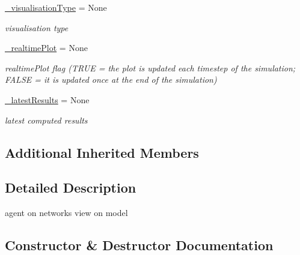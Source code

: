 \begin{DoxyCompactItemize}
\hyperlink{class_mu_mo_t_1_1_mu_mo_t_1_1_mu_mo_t_s_s_a_view_ae8c8d7969b8ab8f31df9d1d1d10eabb9}{\+\_\+visualisation\+Type} = None
\begin{DoxyCompactList}\small\item\em visualisation type \end{DoxyCompactList}\item 
\hyperlink{class_mu_mo_t_1_1_mu_mo_t_1_1_mu_mo_t_s_s_a_view_a194d04e5fee40987d78aa7e1f721ea28}{\+\_\+realtime\+Plot} = None
\begin{DoxyCompactList}\small\item\em realtime\+Plot flag (T\+R\+UE = the plot is updated each timestep of the simulation; F\+A\+L\+SE = it is updated once at the end of the simulation) \end{DoxyCompactList}\item 
\hyperlink{class_mu_mo_t_1_1_mu_mo_t_1_1_mu_mo_t_s_s_a_view_a8da8c49a2b0ccc518cf7f333bdbd17a6}{\+\_\+latest\+Results} = None
\begin{DoxyCompactList}\small\item\em latest computed results \end{DoxyCompactList}\end{DoxyCompactItemize}
\subsection*{Additional Inherited Members}


\subsection{Detailed Description}
agent on networks view on model 

\subsection{Constructor \& Destructor Documentation}
\mbox{\label{class_mu_mo_t_1_1_mu_mo_t_1_1_mu_mo_t_s_s_a_view_ae0e9bcf60ca39799461bccf0e672c323}} 
